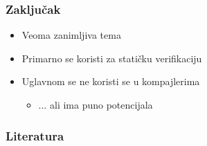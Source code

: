 \documentclass[xetex,mathserif,serif]{beamer}
\begin{document}
  \begin{frame}
    \frametitle{Zaklju\v cak}
	\begin{center}
		\begin{itemize}
 			\item Veoma zanimljiva tema \pause
			\item Primarno se koristi za stati\v cku verifikaciju \pause
			\item Uglavnom se ne koristi se u kompajlerima \pause
			\begin{itemize}
				\item $\dots$ {\color{green} ali ima puno potencijala}
			\end{itemize}
			
		\end{itemize}
	\end{center}
  \end{frame}
    \begin{frame}
    \frametitle{Literatura}
	\begin{center}
	\end{center}
  \end{frame}
\end{document}
